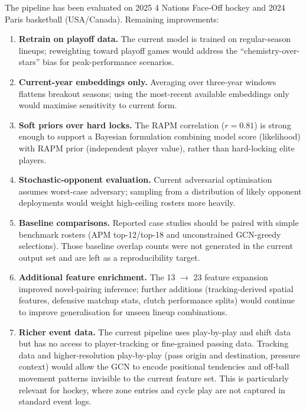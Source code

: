 \documentclass[12pt,letterpaper]{article}
\begin{document}
The pipeline has been evaluated on 2025 4 Nations Face-Off hockey and
2024 Paris basketball (USA/Canada).
Remaining improvements:

\begin{enumerate}[leftmargin=*]
  \item \textbf{Retrain on playoff data.}
    The current model is trained on regular-season lineups; reweighting
    toward playoff games would address the ``chemistry-over-stars'' bias
    for peak-performance scenarios.
  \item \textbf{Current-year embeddings only.}
    Averaging over three-year windows flattens breakout seasons; using
    the most-recent available embeddings only would maximise sensitivity
    to current form.
  \item \textbf{Soft priors over hard locks.}
    The RAPM correlation ($r = 0.81$) is strong enough to support a
    Bayesian formulation combining model score (likelihood) with RAPM
    prior (independent player value), rather than hard-locking elite
    players.
  \item \textbf{Stochastic-opponent evaluation.}
    Current adversarial optimisation assumes worst-case adversary;
    sampling from a distribution of likely opponent deployments would
    weight high-ceiling rosters more heavily.
  \item \textbf{Baseline comparisons.}
    Reported case studies should be paired with simple benchmark rosters
    (APM top-12/top-18 and unconstrained GCN-greedy selections).
    Those baseline overlap counts were not generated in the current
    output set and are left as a reproducibility target.
  \item \textbf{Additional feature enrichment.}
    The 13 $\to$ 23 feature expansion improved novel-pairing inference;
    further additions (tracking-derived spatial features, defensive
    matchup stats, clutch performance splits) would continue to improve
    generalisation for unseen lineup combinations.
  \item \textbf{Richer event data.}
    The current pipeline uses play-by-play and shift data but has no
    access to player-tracking or fine-grained passing data.
    Tracking data and higher-resolution play-by-play (pass origin and
    destination, pressure context) would allow the GCN to encode
    positional tendencies and off-ball movement patterns invisible to
    the current feature set.
    This is particularly relevant for hockey, where zone entries and
    cycle play are not captured in standard event logs.
\end{enumerate}
\end{document}
